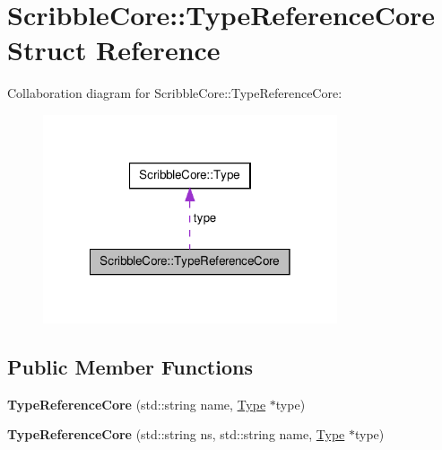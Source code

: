 \hypertarget{struct_scribble_core_1_1_type_reference_core}{\section{Scribble\-Core\-:\-:Type\-Reference\-Core Struct Reference}
\label{struct_scribble_core_1_1_type_reference_core}
}


Collaboration diagram for Scribble\-Core\-:\-:Type\-Reference\-Core\-:\nopagebreak
\begin{figure}[H]
\begin{center}
\leavevmode
\includegraphics[width=246pt]{struct_scribble_core_1_1_type_reference_core__coll__graph}
\end{center}
\end{figure}
\subsection*{Public Member Functions}
\begin{DoxyCompactItemize}
\item 
\hypertarget{struct_scribble_core_1_1_type_reference_core_ab9c58f694c3163be584e819417bbfca9}{{\bfseries Type\-Reference\-Core} (std\-::string name, \hyperlink{class_scribble_core_1_1_type}{Type} $\ast$type)}\label{struct_scribble_core_1_1_type_reference_core_ab9c58f694c3163be584e819417bbfca9}

\item 
\hypertarget{struct_scribble_core_1_1_type_reference_core_a5d26723df27dc125c4cf11c563d24a4e}{{\bfseries Type\-Reference\-Core} (std\-::string ns, std\-::string name, \hyperlink{class_scribble_core_1_1_type}{Type} $\ast$type)}\label{struct_scribble_core_1_1_type_reference_core_a5d26723df27dc125c4cf11c563d24a4e}

\end{DoxyCompactItemize}
